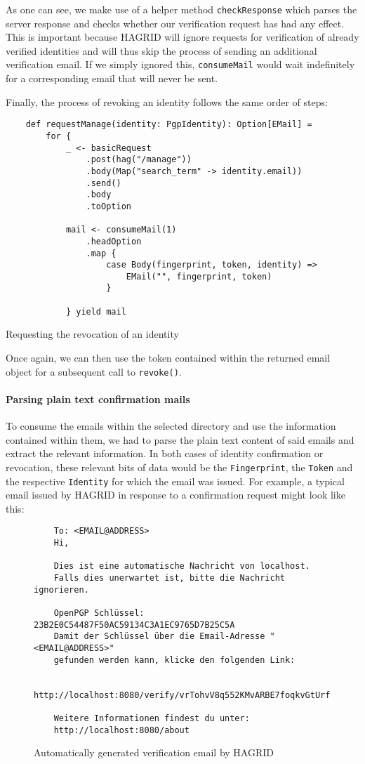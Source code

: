 As one can see, we make use of a helper method \texttt{checkResponse} which parses the server response and checks whether our verification request has had any effect. This is important because HAGRID will ignore requests for verification of already verified identities and will thus skip the process of sending an additional verification email. If we simply ignored this, \texttt{consumeMail} would wait indefinitely for a corresponding email that will never be sent. 

Finally, the process of revoking an identity follows the same order of steps: 
\begin{code}
    \begin{verbatim}
    def requestManage(identity: PgpIdentity): Option[EMail] = 
        for {
            _ <- basicRequest
                .post(hag("/manage"))
                .body(Map("search_term" -> identity.email))
                .send()
                .body
                .toOption
        
            mail <- consumeMail(1)
                .headOption
                .map { 
                    case Body(fingerprint, token, identity) => 
                        EMail("", fingerprint, token) 
                    }
        
            } yield mail   
    \end{verbatim}
    \caption{Requesting the revocation of an identity}
\end{code}
Once again, we can then use the token contained within the returned email object for a subsequent call to \texttt{revoke()}.
\paragraph{Parsing plain text confirmation mails}
To consume the emails within the selected directory and use the information contained within them, we had to parse the plain text content of said emails and extract the relevant information. In both cases of identity confirmation or revocation, these relevant bits of data would be the \texttt{Fingerprint}, the \texttt{Token} and the respective \texttt{Identity} for which the email was issued. For example, a typical email issued by HAGRID in response to a confirmation request might look like this: 
\begin{figure}[H]
    \begin{verbatim}
    To: <EMAIL@ADDRESS> 
    Hi,
    
    Dies ist eine automatische Nachricht von localhost.
    Falls dies unerwartet ist, bitte die Nachricht ignorieren.

    OpenPGP Schlüssel: 23B2E0C54487F50AC59134C3A1EC9765D7B25C5A 
    Damit der Schlüssel über die Email-Adresse "<EMAIL@ADDRESS>" 
    gefunden werden kann, klicke den folgenden Link:
    
    http://localhost:8080/verify/vrTohvV8q552KMvARBE7foqkvGtUrf
    
    Weitere Informationen findest du unter:
    http://localhost:8080/about
    \end{verbatim}
    \caption{Automatically generated verification email by HAGRID}
\end{figure}


